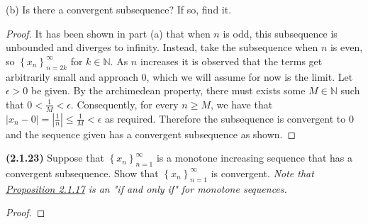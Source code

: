 \documentclass[12pt]{article}
\newcommand{\set}[1]{\left\{ {#1} \right\}}
\newcommand{\abs}[1]{\left| {#1} \right|}
\newcommand{\bN}{\mathbb{N}}
\begin{document}
\noindent (b) Is there a convergent subsequence? If so, find it.

\begin{proof}
	It has been shown in part (a) that when $n$ is odd, this subsequence is unbounded and diverges to infinity. Instead, take the subsequence when $n$ is even, so $\set{x_n}_{n=2k}^\infty$ for $k\in\bN$. As $n$ increases it is observed that the terms get arbitrarily small and approach 0, which we will assume for now is the limit. Let $\epsilon>0$ be given. By the archimedean property, there must exists some $M\in\bN$ such that $0<\frac{1}{M}<\epsilon$. Consequently, for every $n\ge M$, we have that $\abs{x_n-0}=\abs{\frac{1}{n}}\le \frac{1}{M}<\epsilon$ as required. Therefore the subsequence is convergent to 0 and the sequence given has a convergent subsequence as shown.
\end{proof}

\newpage

\noindent \textbf{(2.1.23)} Suppose that $\set{x_n}_{n=1}^\infty$ is a monotone increasing sequence that has a convergent subsequence. Show that $\set{x_n}_{n=1}^\infty$ is convergent. \textit{Note that \underline{Proposition 2.1.17} is an "if and only if" for monotone sequences.}

\begin{proof}
	\lipsum[1]
\end{proof}
\end{document}
